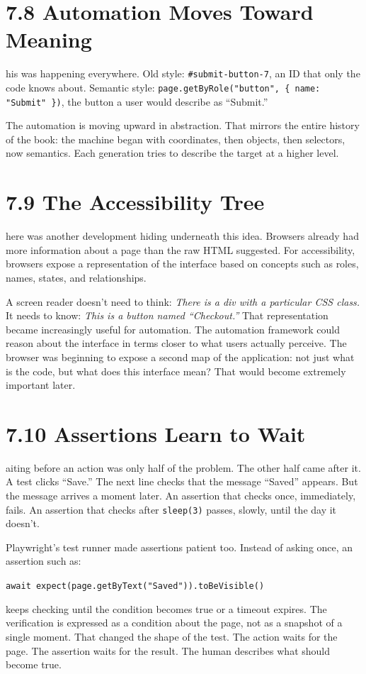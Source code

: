 \documentclass[11pt, a4paper, openany]{book}
\newcommand{\initialcap}[1]{{\fontfamily{lmss}\selectfont\huge\textbf{#1}}}
\begin{document}
\section{7.8 Automation Moves Toward Meaning}
\noindent \initialcap{T}his was happening everywhere. Old style: \texttt{\#submit-button-7}, an ID that only the code knows about. Semantic style: \texttt{page.getByRole("button", \{ name: "Submit" \})}, the button a user would describe as ``Submit.'' 

The automation is moving upward in abstraction. That mirrors the entire history of the book: the machine began with coordinates, then objects, then selectors, now semantics. Each generation tries to describe the target at a higher level.

\section{7.9 The Accessibility Tree}
\noindent \initialcap{T}here was another development hiding underneath this idea. Browsers already had more information about a page than the raw HTML suggested. For accessibility, browsers expose a representation of the interface based on concepts such as roles, names, states, and relationships. 

A screen reader doesn't need to think: \textit{There is a div with a particular CSS class.} It needs to know: \textit{This is a button named ``Checkout.''} That representation became increasingly useful for automation. The automation framework could reason about the interface in terms closer to what users actually perceive. The browser was beginning to expose a second map of the application: not just what is the code, but what does this interface mean? That would become extremely important later.

\section{7.10 Assertions Learn to Wait}
\noindent \initialcap{W}aiting before an action was only half of the problem. The other half came after it. A test clicks ``Save.'' The next line checks that the message ``Saved'' appears. But the message arrives a moment later. An assertion that checks once, immediately, fails. An assertion that checks after \texttt{sleep(3)} passes, slowly, until the day it doesn't.

Playwright's test runner made assertions patient too. Instead of asking once, an assertion such as:
\begin{center}
\texttt{await expect(page.getByText("Saved")).toBeVisible()}
\end{center}
keeps checking until the condition becomes true or a timeout expires. The verification is expressed as a condition about the page, not as a snapshot of a single moment. That changed the shape of the test. The action waits for the page. The assertion waits for the result. The human describes what should become true.
\end{document}
